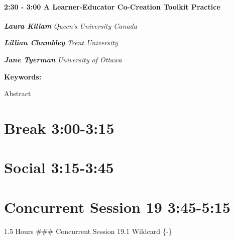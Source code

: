 \documentclass[
]{book}
\begin{document}
\begin{session}
\hypertarget{a-learner-educator-co-creation-toolkit-practice}{%
\paragraph*{\texorpdfstring{2:30 - 3:00 \textbar{} \textbf{A
Learner-Educator Co-Creation Toolkit} \textbar{}
Practice}{2:30 - 3:00 \textbar{} A Learner-Educator Co-Creation Toolkit \textbar{} Practice}}\label{a-learner-educator-co-creation-toolkit-practice}}

\textbf{\emph{Laura Killam}} \textbar{} \emph{Queen's University Canada}

\textbf{\emph{Lillian Chumbley}} \textbar{} \emph{Trent University }

\textbf{\emph{Jane Tyerman}} \textbar{} \emph{University of Ottawa}

\textbf{Keywords:}

Abstract
\end{session}

\hypertarget{break-300-315-1}{%
\section*{Break \textbar{} 3:00-3:15}\label{break-300-315-1}}

\hypertarget{social-315-345-1}{%
\section*{Social \textbar{} 3:15-3:45}\label{social-315-345-1}}

\hypertarget{concurrent-session-19-345-515}{%
\section*{Concurrent Session 19 \textbar{} 3:45-5:15}\label{concurrent-session-19-345-515}}

1.5 Hours
\#\#\# Concurrent Session 19.1 \textbar{} Wildcard \{-\}
\end{document}
